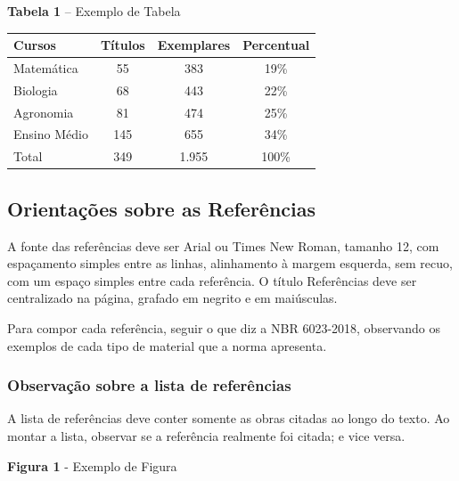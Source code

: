 \documentclass[12pt, a4paper]{article}
\begin{document}
\vspace{0.5cm}
\begin{center}
    \textbf{Tabela 1} -- Exemplo de Tabela \\[0.2cm]
    \small
    \begin{tabular}{lccc}
        \toprule
        Cursos & Títulos & Exemplares & Percentual \\
        \midrule
        Matemática & 55 & 383 & 19\% \\
        Biologia & 68 & 443 & 22\% \\
        Agronomia & 81 & 474 & 25\% \\
        Ensino Médio & 145 & 655 & 34\% \\
        \midrule
        Total & 349 & 1.955 & 100\% \\
        \bottomrule
    \end{tabular}
\end{center}
\vspace{0.5cm}

\subsection{Orientações sobre as Referências}

A fonte das referências deve ser Arial ou Times New Roman, tamanho 12, com espaçamento simples entre as linhas, alinhamento à margem esquerda, sem recuo, com um espaço simples entre cada referência. O título Referências deve ser centralizado na página, grafado em negrito e em maiúsculas.

Para compor cada referência, seguir o que diz a NBR 6023-2018, observando os exemplos de cada tipo de material que a norma apresenta.

\subsubsection{Observação sobre a lista de referências}

A lista de referências deve conter somente as obras citadas ao longo do texto. Ao montar a lista, observar se a referência realmente foi citada; e vice versa.

\vspace{0.5cm}
\begin{center}
    \textbf{Figura 1} - Exemplo de Figura\\[0.2cm]
\end{center}
\vspace{0.5cm}
\end{document}
